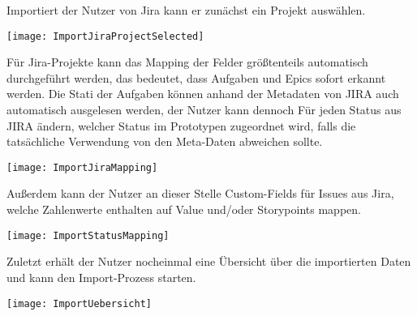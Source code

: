 Importiert der Nutzer von Jira kann er zunächst ein Projekt auswählen.

\vspace{20pt}
\begin{center}
    \begin{minipage}{1\linewidth}
        \texttt{[image: ImportJiraProjectSelected]}
    \end{minipage}
\end{center}
\vspace{20pt}

Für Jira-Projekte kann das Mapping der Felder größtenteils automatisch durchgeführt werden, das bedeutet, dass Aufgaben und Epics sofort erkannt werden. Die Stati der Aufgaben können anhand der Metadaten von JIRA auch automatisch ausgelesen werden, der Nutzer kann dennoch Für jeden Status aus JIRA ändern, welcher Status im Prototypen zugeordnet wird, falls die tatsächliche Verwendung von den Meta-Daten abweichen sollte.

\vspace{20pt}
\begin{center}
    \begin{minipage}{1\linewidth}
        \texttt{[image: ImportJiraMapping]}
    \end{minipage}
\end{center}
\vspace{20pt}

Außerdem kann der Nutzer an dieser Stelle Custom-Fields für Issues aus Jira, welche Zahlenwerte enthalten auf Value und/oder Storypoints mappen.

\vspace{20pt}
\begin{center}
    \begin{minipage}{1\linewidth}
        \texttt{[image: ImportStatusMapping]}
    \end{minipage}
\end{center}
\vspace{20pt}

Zuletzt erhält der Nutzer nocheinmal eine Übersicht über die importierten Daten und kann den Import-Prozess starten.

\vspace{20pt}
\begin{center}
    \begin{minipage}{1\linewidth}
        \texttt{[image: ImportUebersicht]}
    \end{minipage}
\end{center}
\vspace{20pt}


